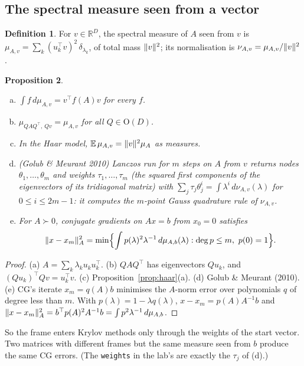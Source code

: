 \documentclass[11pt,a4paper]{article}
\newcommand{\R}{\mathbb{R}}
\newcommand{\E}{\mathbb{E}}
\newcommand{\Orth}{\mathrm{O}}
\DeclarePairedDelimiter{\norm}{\lVert}{\rVert}
\theoremstyle{plain}
\newtheorem{proposition}{Proposition}[section]
\theoremstyle{definition}
\newtheorem{definition}[proposition]{Definition}
\theoremstyle{remark}
\begin{document}
\subsection{The spectral measure seen from a vector}\label{sec:seen}

\begin{definition}
For $v\in\R^D$, the spectral measure of $A$ seen from $v$ is $\mu_{A,v}=\sum_k(u_k^\top v)^2\,\delta_{\lambda_k}$,
of total mass $\norm{v}^2$; its normalisation is $\nu_{A,v}=\mu_{A,v}/\norm{v}^2$.
\end{definition}

\begin{proposition}\label{prop:seen}
\begin{enumerate}[(a)]
\item $\int f\,d\mu_{A,v}=v^\top f(A)v$ for every $f$.
\item $\mu_{QAQ^\top,\,Qv}=\mu_{A,v}$ for all $Q\in\Orth(D)$.
\item In the Haar model, $\E\,\mu_{A,v}=\norm{v}^2\mu_A$ as measures.
\item (Golub \& Meurant 2010) Lanczos run for $m$ steps on $A$ from $v$ returns nodes $\theta_1,\dots,\theta_m$ and
  weights $\tau_1,\dots,\tau_m$ (the squared first components of the eigenvectors of its tridiagonal matrix) with
  $\sum_j\tau_j\theta_j^i=\int\lambda^i\,d\nu_{A,v}(\lambda)$ for $0\le i\le2m-1$: it computes the $m$-point Gauss
  quadrature rule of $\nu_{A,v}$.
\item For $A\succ0$, conjugate gradients on $Ax=b$ from $x_0=0$ satisfies
  \[\norm{x-x_m}_A^2=\min\Bigl\{\int p(\lambda)^2\lambda^{-1}\,d\mu_{A,b}(\lambda):\deg p\le m,\ p(0)=1\Bigr\}.\]
\end{enumerate}
\end{proposition}
\begin{proof}
(a) $A=\sum_k\lambda_ku_ku_k^\top$. (b) $QAQ^\top$ has eigenvectors $Qu_k$, and $(Qu_k)^\top Qv=u_k^\top v$.
(c) Proposition~\ref{prop:haar}(a). (d) Golub \& Meurant (2010). (e) CG's iterate $x_m=q(A)b$ minimises the $A$-norm
error over polynomials $q$ of degree less than $m$. With $p(\lambda)=1-\lambda q(\lambda)$,
$x-x_m=p(A)A^{-1}b$ and $\norm{x-x_m}_A^2=b^\top p(A)^2A^{-1}b=\int p^2\lambda^{-1}\,d\mu_{A,b}$.
\end{proof}
So the frame enters Krylov methods only through the weights of the start vector. Two matrices with different frames
but the same measure seen from $b$ produce the same CG errors. (The \texttt{weights} in the lab's
 are exactly the $\tau_j$ of (d).)
\end{document}
